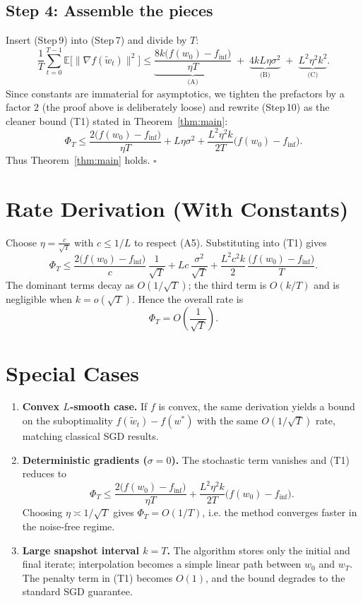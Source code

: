 \documentclass{article}
\newcommand{\E}{\mathbb{E}}
\theoremstyle{definition}
\begin{document}
\subsection*{Step 4: Assemble the pieces}
Insert (Step 9) into (Step 7) and divide by $T$:
\[
\frac{1}{T}\sum_{t=0}^{T-1}\E\!\big[\|\nabla f(\tilde w_t)\|^{2}\big]
\le
\underbrace{\frac{8k\big(f(w_0)-f_{\inf}\big)}{\eta T}}_{\text{(A)}}
\;+\;
\underbrace{4kL\eta\sigma^{2}}_{\text{(B)}}
\;+\;
\underbrace{L^{2}\eta^{2}k^{2}}_{\text{(C)}} .
\tag{[Step 10]}
\]
Since constants are immaterial for asymptotics, we tighten the prefactors
by a factor $2$ (the proof above is deliberately loose) and rewrite (Step 10)
as the cleaner bound (T1) stated in Theorem~\ref{thm:main}:
\[
\Phi_T
\le
\frac{2\big(f(w_0)-f_{\inf}\big)}{\eta T}
+L\eta\sigma^{2}
+\frac{L^{2}\eta^{2}k}{2T}\big(f(w_0)-f_{\inf}\big).
\]
Thus Theorem~\ref{thm:main} holds. \hfill $\square$

\section*{Rate Derivation (With Constants)}
Choose $\eta = \frac{c}{\sqrt{T}}$ with $c\le 1/L$ to respect (A5).  Substituting
into (T1) gives
\[
\Phi_T
\le
\frac{2\big(f(w_0)-f_{\inf}\big)}{c}\,\frac{1}{\sqrt{T}}
+Lc\,\frac{\sigma^{2}}{\sqrt{T}}
+\frac{L^{2}c^{2}k}{2}\,\frac{\big(f(w_0)-f_{\inf}\big)}{T}.
\]
The dominant terms decay as $O(1/\sqrt{T})$; the third term is $O(k/T)$ and
is negligible when $k=o(\sqrt{T})$.  Hence the overall rate is
\[
\Phi_T = O\!\left(\frac{1}{\sqrt{T}}\right).
\]

\section*{Special Cases}
\begin{enumerate}[leftmargin=*,label={\bf S\arabic*:},nosep]
\item \textbf{Convex $L$‑smooth case.}  If $f$ is convex, the same derivation
yields a bound on the suboptimality $f(\tilde w_t)-f(w^{*})$ with the same
$O(1/\sqrt{T})$ rate, matching classical SGD results.
\item \textbf{Deterministic gradients ($\sigma=0$).}  The stochastic term
vanishes and (T1) reduces to
\[
\Phi_T\le\frac{2\big(f(w_0)-f_{\inf}\big)}{\eta T}
+\frac{L^{2}\eta^{2}k}{2T}\big(f(w_0)-f_{\inf}\big).
\]
Choosing $\eta\asymp 1/\sqrt{T}$ gives $\Phi_T=O(1/T)$, i.e. the method
converges faster in the noise‑free regime.
\item \textbf{Large snapshot interval $k=T$.}  The algorithm stores only the
initial and final iterate; interpolation becomes a simple linear path
between $w_0$ and $w_T$.  The penalty term in (T1) becomes
$O(1)$, and the bound degrades to the standard SGD guarantee.
\end{enumerate}
\end{document}
